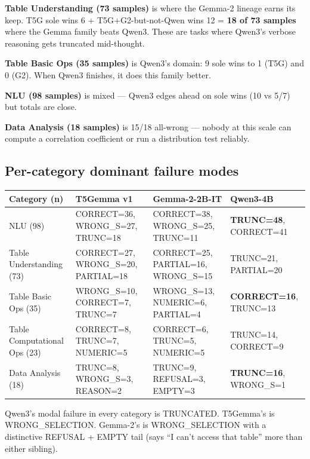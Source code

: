 \documentclass[11pt]{article}
\begin{document}
\textbf{Table Understanding (73 samples)} is where the Gemma-2 lineage earns
its keep. T5G sole wins 6 + T5G+G2-but-not-Qwen wins 12 = \textbf{18 of 73
samples} where the Gemma family beats Qwen3. These are tasks where Qwen3's
verbose reasoning gets truncated mid-thought.

\textbf{Table Basic Ops (35 samples)} is Qwen3's domain: 9 sole wins to 1
(T5G) and 0 (G2). When Qwen3 finishes, it does this family better.

\textbf{NLU (98 samples)} is mixed --- Qwen3 edges ahead on sole wins (10
vs 5/7) but totals are close.

\textbf{Data Analysis (18 samples)} is 15/18 all-wrong --- nobody at this
scale can compute a correlation coefficient or run a distribution test reliably.

\subsection*{Per-category dominant failure modes}

\begin{center}\footnotesize
\begin{tabular}{l l l l}
\toprule
\textbf{Category (n)} & \textbf{T5Gemma v1} & \textbf{Gemma-2-2B-IT} & \textbf{Qwen3-4B} \\
\midrule
NLU (98)                     & CORRECT=36, WRONG\_S=27, TRUNC=18 & CORRECT=38, WRONG\_S=25, TRUNC=11 & \textbf{TRUNC=48}, CORRECT=41 \\
Table Understanding (73)     & CORRECT=27, WRONG\_S=20, PARTIAL=18 & CORRECT=25, PARTIAL=16, WRONG\_S=15 & TRUNC=21, PARTIAL=20 \\
Table Basic Ops (35)         & WRONG\_S=10, CORRECT=7, TRUNC=7 & WRONG\_S=13, NUMERIC=6, PARTIAL=4 & \textbf{CORRECT=16}, TRUNC=13 \\
Table Computational Ops (23) & CORRECT=8, TRUNC=7, NUMERIC=5 & CORRECT=6, TRUNC=5, NUMERIC=5 & TRUNC=14, CORRECT=9 \\
Data Analysis (18)           & TRUNC=8, WRONG\_S=3, REASON=2 & TRUNC=9, REFUSAL=3, EMPTY=3 & \textbf{TRUNC=16}, WRONG\_S=1 \\
\bottomrule
\end{tabular}
\end{center}

Qwen3's modal failure in every category is TRUNCATED. T5Gemma's is
WRONG\_SELECTION. Gemma-2's is WRONG\_SELECTION with a distinctive
REFUSAL + EMPTY tail (says ``I can't access that table'' more than
either sibling).
\end{document}
